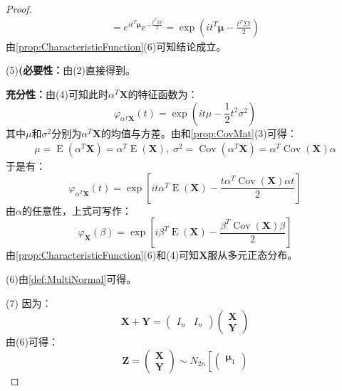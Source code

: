 \begin{proof}
\begin{align*}
		=e^{it^T\boldsymbol{\mu}}e^{-\frac{t^T\Sigma t}{2}}
		=\exp\left(it^T\boldsymbol{\mu}-\frac{t^T\Sigma t}{2}\right)
	\end{align*}
	由\cref{prop:CharacteristicFunction}(6)可知结论成立。\par
	(5)\textbf{(必要性：}由(2)直接得到。\par
	\textbf{充分性：}由(4)可知此时$\alpha^T\mathbf{X}$的特征函数为：
	\begin{equation*}
		\varphi_{\alpha^T\mathbf{X}}(t)=\exp\left(it\mu-\frac{1}{2}t^2\sigma^2\right)
	\end{equation*}
	其中$\mu$和$\sigma^2$分别为$\alpha^T\mathbf{X}$的均值与方差。由和\cref{prop:CovMat}(3)可得：
	\begin{gather*}
		\mu=\operatorname{E}(\alpha^T\mathbf{X})=\alpha^T\operatorname{E}(\mathbf{X}),\;
		\sigma^2=\operatorname{Cov}(\alpha^T\mathbf{X})=\alpha^T\operatorname{Cov}(\mathbf{X})\alpha
	\end{gather*}
	于是有：
	\begin{equation*}
		\varphi_{\alpha^T\mathbf{X}}(t)=\exp\left[it\alpha^T\operatorname{E}(\mathbf{X})-\frac{t\alpha^T\operatorname{Cov}(\mathbf{X})\alpha t}{2}\right]
	\end{equation*}
	由$\alpha$的任意性，上式可写作：
	\begin{equation*}
		\varphi_{\mathbf{X}}(\beta)=\exp\left[i\beta^T\operatorname{E}(\mathbf{X})-\frac{\beta^T\operatorname{Cov}(\mathbf{X})\beta}{2}\right]
	\end{equation*}
	由\cref{prop:CharacteristicFunction}(6)和(4)可知$\mathbf{X}$服从多元正态分布。\par
	(6)由\cref{def:MultiNormal}可得。\par
	(7)	因为：
	\begin{equation*}
		\mathbf{X}+\mathbf{Y}=
		\begin{pmatrix}
			I_n & I_n
		\end{pmatrix}
		\begin{pmatrix}
			\mathbf{X} \\
			\mathbf{Y}
		\end{pmatrix}
	\end{equation*}
	由(6)可得：
	\begin{equation*}
		\mathbf{Z}=
		\begin{pmatrix}
			\mathbf{X} \\
			\mathbf{Y}
		\end{pmatrix}
		\sim N_{2n}\left[
		\begin{pmatrix}
			\boldsymbol{\mu}_1 \\

\end{pmatrix}
\end{equation*}
\end{proof}
